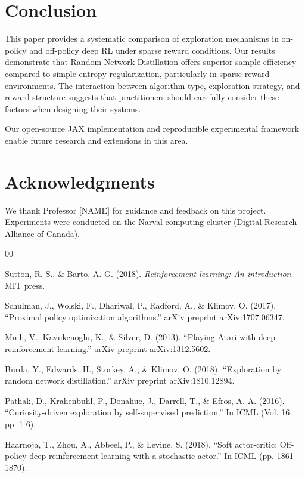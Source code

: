 \documentclass[conference]{IEEEtran}
\begin{document}
\section{Conclusion}

This paper provides a systematic comparison of exploration mechanisms in on-policy and off-policy deep RL under sparse reward conditions. Our results demonstrate that Random Network Distillation offers superior sample efficiency compared to simple entropy regularization, particularly in sparse reward environments. The interaction between algorithm type, exploration strategy, and reward structure suggests that practitioners should carefully consider these factors when designing their systems.

Our open-source JAX implementation and reproducible experimental framework enable future research and extensions in this area.

\section*{Acknowledgments}

We thank Professor [NAME] for guidance and feedback on this project. Experiments were conducted on the Narval computing cluster (Digital Research Alliance of Canada).

\begin{thebibliography}{00}

  Sutton, R. S., \& Barto, A. G. (2018).
  \textit{Reinforcement learning: An introduction}.
  MIT press.

  Schulman, J., Wolski, F., Dhariwal, P., Radford, A., \& Klimov, O. (2017).
  ``Proximal policy optimization algorithms.''
  arXiv preprint arXiv:1707.06347.

  Mnih, V., Kavukcuoglu, K., \& Silver, D. (2013).
  ``Playing Atari with deep reinforcement learning.''
  arXiv preprint arXiv:1312.5602.

  Burda, Y., Edwards, H., Storkey, A., \& Klimov, O. (2018).
  ``Exploration by random network distillation.''
  arXiv preprint arXiv:1810.12894.

  Pathak, D., Krahenbuhl, P., Donahue, J., Darrell, T., \& Efros, A. A. (2016).
  ``Curiosity-driven exploration by self-supervised prediction.''
  In ICML (Vol. 16, pp. 1-6).

  Haarnoja, T., Zhou, A., Abbeel, P., \& Levine, S. (2018).
  ``Soft actor-critic: Off-policy deep reinforcement learning with a stochastic actor.''
  In ICML (pp. 1861-1870).

\end{thebibliography}
\end{document}
